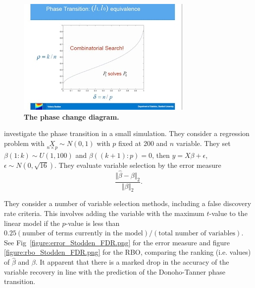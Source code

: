 \documentclass[10pt,letterpaper]{article}
\begin{document}
\begin{figure}[tbhp] 
 \begin{adjustwidth}{-1.00in}{0in}
    \centering
    \includegraphics[totalheight=6cm]{./figs/phase-diagram-equivalence.png} 
    \caption{{\bf The phase change diagram.}}
    \label{figure:phase-diagram-equivalence.png} 
    \vspace{4ex}
  \end{adjustwidth}
\end{figure}


\cite{Donoho.and.Stodden.2006} investigate the phase transition in a small simulation.  They consider a regression problem with 
$\underset{n\times p}{X}\sim N(0,1)$ with $p$ fixed at 200 and $n$ variable.
They  set $\beta(1:k) \sim U(1,100)$ and $\beta((k+1):p) =0$, then  $y= X\beta + \epsilon$, $\epsilon \sim
N(0,\sqrt{16})$. They evaluate variable selection by the error measure 
$$\frac{\Vert\hat{\beta}-\beta\Vert_2}{\Vert\beta\Vert_2}.$$

They consider a number of variable selection methods, including a false discovery rate criteria. This involves adding
the variable with the maximum $t$-value to the linear model if the $p$-value is less than 
$0.25(\text{number of  terms  currently  in  the  model})/(\text{total  number  of  variables})$.  
See Fig~\ref{figure:error_Stodden_FDR.png} for the error measure and
figure \ref{figure:rbo_Stodden_FDR.png} for the RBO, comparing the ranking (i.e. values) of $\hat{\beta}$ and $\beta$.
It apparent that there is a marked drop in the accuracy of the variable recovery in line with the prediction of the
Donoho-Tanner phase transition.
\end{document}
